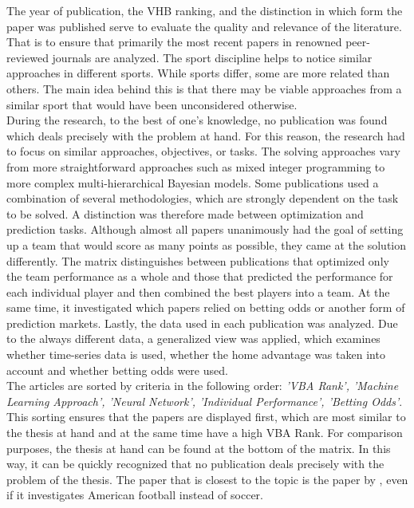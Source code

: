 The year of publication, the VHB ranking, and the distinction in which form the paper was published serve to evaluate the quality and relevance of the literature. That is to ensure that primarily the most recent papers in renowned peer-reviewed journals are analyzed. The sport discipline helps to notice similar approaches in different sports. While sports differ, some are more related than others. The main idea behind this is that there may be viable approaches from a similar sport that would have been unconsidered otherwise.  \\
\indent During the research, to the best of one's knowledge, no publication was found which deals precisely with the problem at hand. For this reason, the research had to focus on similar approaches, objectives, or tasks. The solving approaches vary from more straightforward approaches such as mixed integer programming to more complex multi-hierarchical Bayesian models. Some publications used a combination of several methodologies, which are strongly dependent on the task to be solved. A distinction was therefore made between optimization and prediction tasks. Although almost all papers unanimously had the goal of setting up a team that would score as many points as possible, they came at the solution differently. The matrix distinguishes between publications that optimized only the team performance as a whole and those that predicted the performance for each individual player and then combined the best players into a team. At the same time, it investigated which papers relied on betting odds or another form of prediction markets. Lastly, the data used in each publication was analyzed. Due to the always different data, a generalized view was applied, which examines whether time-series data is used, whether the home advantage was taken into account and whether betting odds were used. \\
\indent The articles are sorted by criteria in the following order: \emph{'VBA Rank', 'Machine Learning Approach', 'Neural Network', 'Individual Performance', 'Betting Odds'}. This sorting ensures that the papers are displayed first, which are most similar to the thesis at hand and at the same time have a high VBA Rank. For comparison purposes, the thesis at hand can be found at the bottom of the matrix. In this way, it can be quickly recognized that no publication deals precisely with the problem of the thesis. The paper that is closest to the topic is the paper by \citet{landers_machine_2017}, even if it investigates American football instead of soccer.

